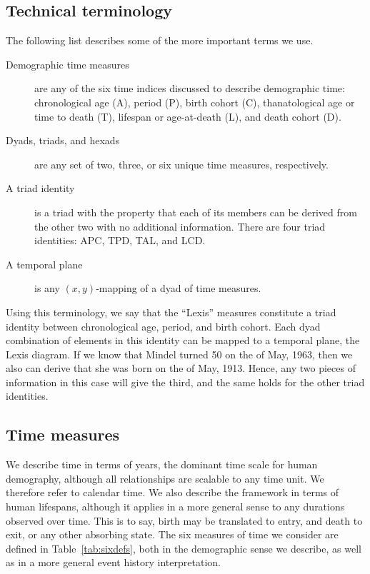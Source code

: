 \documentclass[12pt,oneside,a4paper]{article} %
\theoremstyle{definition}
\begin{document}
\subsection{Technical terminology}
The following list describes some of the more important terms we use.
\begin{description}
\item[Demographic time measures] are any of the six time indices discussed to
describe demographic time: chronological age (A), period (P), birth cohort (C),
thanatological age or time to death (T), lifespan or age-at-death (L), and death
cohort (D).
\item[Dyads, triads, and hexads] are any set of two, three, or six unique time
measures, respectively.
\item[A triad identity] is a triad with the property that each of its members
can be derived from the other two with no additional information. There are four triad
identities: APC, TPD, TAL, and LCD.
\item[A temporal plane] is any $(x,y)$-mapping of a dyad of time measures.
\end{description}
Using this terminology, we say that the ``Lexis'' measures
constitute a triad identity between chronological age, period, and birth cohort. Each dyad
combination of elements in this identity can be mapped to a
temporal plane, the Lexis diagram. If we know that Mindel turned 50 on the
 of May, 1963, then we also can derive that she was born on the  of
May, 1913. Hence, any two pieces of information in this case will give the
third, and the same holds for the other triad identities.

\FloatBarrier
\subsection{Time measures}
\FloatBarrier
We describe time in terms of years, the dominant time scale for human
demography, although all relationships are scalable to any time unit. We
therefore refer to calendar time. We also describe the framework in terms of
human lifespans, although it applies in a more general sense to any durations observed over time. This is to say, birth may be translated to entry, and death
to exit, or any other absorbing state. The six measures of time we consider are
defined in Table~\ref{tab:sixdefs}, both in the demographic sense we describe, as well as in a more general event history interpretation.
\end{document}
